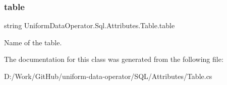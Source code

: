 \subsubsection{\texorpdfstring{table}{table}}
{\footnotesize\ttfamily string Uniform\+Data\+Operator.\+Sql.\+Attributes.\+Table.\+table}



Name of the table. 



The documentation for this class was generated from the following file\+:\begin{DoxyCompactItemize}
\item 
D\+:/\+Work/\+Git\+Hub/uniform-\/data-\/operator/\+S\+Q\+L/\+Attributes/Table.\+cs\end{DoxyCompactItemize}
